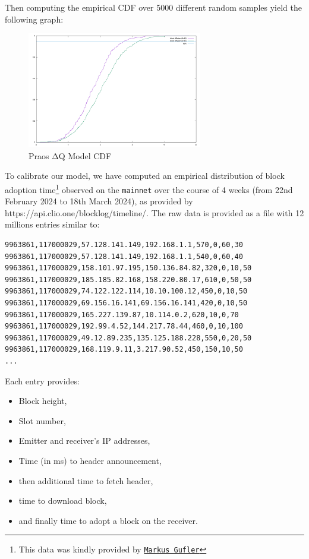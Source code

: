 \documentclass[10pt]{article}
\providecommand{\tightlist}{%
  \setlength{\itemsep}{0pt}\setlength{\parskip}{0pt}}
\begin{document}
Then computing the empirical CDF over 5000 different random samples
yield the following graph:

\begin{figure}
\centering
\includegraphics[width=0.68\textwidth]{../diagrams/plot-hops-distribution.png}
\caption{Praos ΔQ Model CDF}
\end{figure}

To calibrate our model, we have computed an empirical distribution of
block adoption time\footnote{This data was kindly provided by
  \href{https://www.linkedin.com/in/markus-gufler}{\color{blue}\texttt{Markus Gufler}}}
observed on the \texttt{mainnet} over the course of 4 weeks (from 22nd
February 2024 to 18th March 2024), as provided by
https://api.clio.one/blocklog/timeline/. The raw data is provided as a
file with 12 millions entries similar to:

\begin{verbatim}
9963861,117000029,57.128.141.149,192.168.1.1,570,0,60,30
9963861,117000029,57.128.141.149,192.168.1.1,540,0,60,40
9963861,117000029,158.101.97.195,150.136.84.82,320,0,10,50
9963861,117000029,185.185.82.168,158.220.80.17,610,0,50,50
9963861,117000029,74.122.122.114,10.10.100.12,450,0,10,50
9963861,117000029,69.156.16.141,69.156.16.141,420,0,10,50
9963861,117000029,165.227.139.87,10.114.0.2,620,10,0,70
9963861,117000029,192.99.4.52,144.217.78.44,460,0,10,100
9963861,117000029,49.12.89.235,135.125.188.228,550,0,20,50
9963861,117000029,168.119.9.11,3.217.90.52,450,150,10,50
...
\end{verbatim}

Each entry provides:

\begin{itemize}
\tightlist
\item
  Block height,
\item
  Slot number,
\item
  Emitter and receiver's IP addresses,
\item
  Time (in ms) to header announcement,
\item
  then additional time to fetch header,
\item
  time to download block,
\item
  and finally time to adopt a block on the receiver.
\end{itemize}
\end{document}
